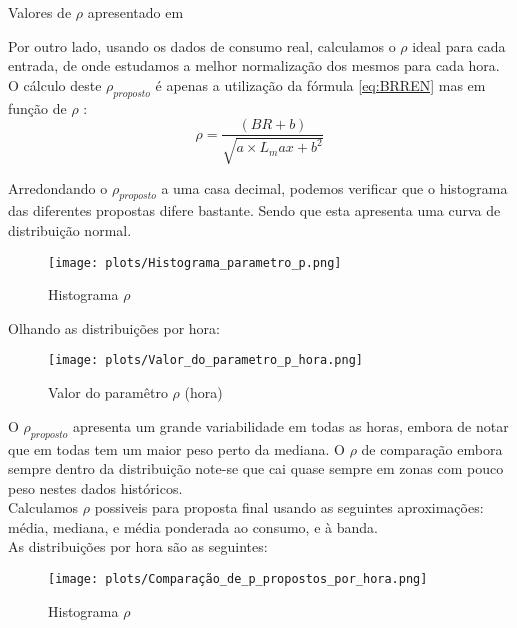 \begin{table}[H] \centering \caption{Valores de $\rho$ apresentado em \cite{Carneiro2016}}  \end{table}


Por outro lado, usando os dados de consumo real, calculamos o $\rho$ ideal para cada entrada, de onde estudamos a melhor normalização dos mesmos para cada hora. \\
O cálculo deste $\rho_{proposto}$ é apenas a utilização da fórmula \ref{eq:BRREN} mas em função de $\rho$ : \\

\begin{equation} \label{eq:rhoproposed} 
    \rho  = \frac{(BR + b)}{\sqrt{a \times L_max + b^{2}}}
\end{equation}


Arredondando o $\rho_{proposto}$ a uma casa decimal, podemos verificar que o histograma das diferentes propostas difere bastante. Sendo que esta apresenta uma curva de distribuição normal. \\


\begin{figure}[H]
    \centering
    \texttt{[image: plots/Histograma\_parametro\_p.png]}
    \caption{Histograma $\rho$}
  \end{figure}


Olhando as distribuições por hora: \\

\begin{figure}[H]
    \centering
    \texttt{[image: plots/Valor\_do\_parametro\_p\_hora.png]}
    \caption{Valor do paramêtro $\rho$ (hora)}
  \end{figure}

O $\rho_{proposto}$ apresenta um grande variabilidade em todas as horas, embora de notar que em todas tem um maior peso perto da mediana. O $\rho$ de comparação embora sempre dentro da distribuição note-se que cai quase sempre em zonas com pouco peso nestes dados históricos. \\
Calculamos $\rho$ possiveis para proposta final usando as seguintes aproximações: média, mediana, e média ponderada ao consumo, e à banda. \\

As distribuições por hora são as seguintes:

\begin{figure}[H]
    \centering
    \texttt{[image: plots/Comparação\_de\_p\_propostos\_por\_hora.png]}
    \caption{Histograma $\rho$}
\end{figure}

